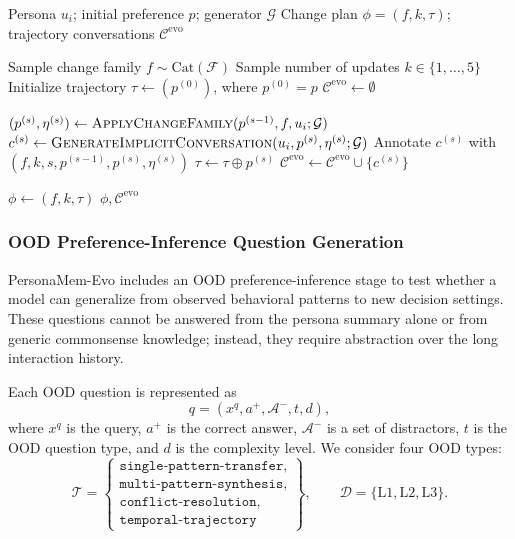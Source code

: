 \documentclass{article}
\begin{document}
\begin{algorithm}[t]
\caption{Sampling Multi-Step Preference Evolution}
\label{alg:preference_evolution}
\begin{algorithmic}[1]
\Require Persona $u_i$; initial preference $p$; generator $\mathcal{G}$
\Ensure Change plan $\phi=(f,k,\tau)$; trajectory conversations $\mathcal{C}^{\mathrm{evo}}$

\State Sample change family $f \sim \mathrm{Cat}(\mathcal{F})$
\State Sample number of updates $k \in \{1,\ldots,5\}$
\State Initialize trajectory $\tau \gets (p^{(0)})$, where $p^{(0)}=p$
\State $\mathcal{C}^{\mathrm{evo}} \gets \emptyset$

    \State $(p^{(s)}, \eta^{(s)}) \gets \textsc{ApplyChangeFamily}(p^{(s-1)},f,u_i;\mathcal{G})$
    \State $c^{(s)} \gets \textsc{GenerateImplicitConversation}(u_i,p^{(s)},\eta^{(s)};\mathcal{G})$
    \State Annotate $c^{(s)}$ with $(f,k,s,p^{(s-1)},p^{(s)},\eta^{(s)})$
    \State $\tau \gets \tau \oplus p^{(s)}$
    \State $\mathcal{C}^{\mathrm{evo}} \gets \mathcal{C}^{\mathrm{evo}} \cup \{c^{(s)}\}$
\EndFor

\State $\phi \gets (f,k,\tau)$
\State \Return $\phi,\mathcal{C}^{\mathrm{evo}}$
\end{algorithmic}
\end{algorithm}

\subsubsection{OOD Preference-Inference Question Generation}
\label{app:persona_ood_generation}
PersonaMem-Evo includes an OOD preference-inference stage to test whether a model can generalize from observed behavioral patterns to new decision settings. These questions cannot be answered from the persona summary alone or from generic commonsense knowledge; instead, they require abstraction over the long interaction history.

Each OOD question is represented as
\[
q = (x^{q}, a^{+}, \mathcal{A}^{-}, t, d),
\]
where $x^q$ is the query, $a^+$ is the correct answer, $\mathcal{A}^{-}$ is a set of distractors, $t$ is the OOD question type, and $d$ is the complexity level. We consider four OOD types:
\[
\mathcal{T} =
\left\{
\begin{array}{l}
\texttt{single-pattern-transfer},\\
\texttt{multi-pattern-synthesis},\\
\texttt{conflict-resolution},\\
\texttt{temporal-trajectory}
\end{array}
\right\},
\qquad
\mathcal{D} = \{\mathrm{L1}, \mathrm{L2}, \mathrm{L3}\}.
\]
\end{document}
